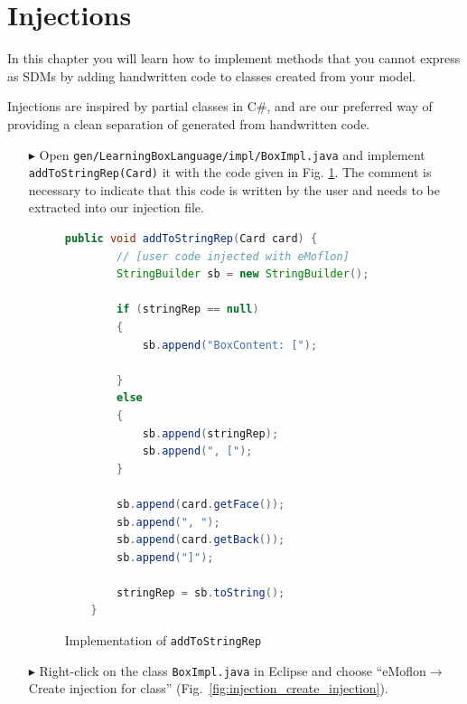 \section{Injections}
\label{sec:intro_injections}

In this chapter you will learn how to implement methods that you cannot express as SDMs by adding handwritten code to classes created from your model.

Injections are inspired by partial classes in C\#, and are our preferred way of providing a clean separation of generated from handwritten code.

\begin{enumerate}
    \item[$\blacktriangleright$] Open \texttt{gen/LearningBoxLanguage/impl/BoxImpl.java} and implement \texttt{addToStringRep(Card)} it with the code given in Fig. \ref{fig:addToStringRep_impl}. The comment is necessary to indicate that this code is written by the user and needs to be extracted into our injection file.

    \begin{figure}[htbp]
        \centering
        \begin{lstlisting}[language=Java, keywordstyle={\bfseries\color{purple}}, backgroundcolor=\color{white}]
    public void addToStringRep(Card card) {
        // [user code injected with eMoflon]
        StringBuilder sb = new StringBuilder();

        if (stringRep == null)
        {
            sb.append("BoxContent: [");

        }
        else
        {
            sb.append(stringRep);
            sb.append(", [");
        }

        sb.append(card.getFace());
        sb.append(", ");
        sb.append(card.getBack());
        sb.append("]");

        stringRep = sb.toString();
    }
        \end{lstlisting}
        \caption{Implementation of \texttt{addToStringRep}}
        \label{fig:addToStringRep_impl}
    \end{figure}

    \item[$\blacktriangleright$] Right-click on the class \texttt{BoxImpl.java} in Eclipse and choose ``eMoflon$\rightarrow$Create injection for class'' (Fig.~\ref{fig:injection_create_injection}).


\end{enumerate}
